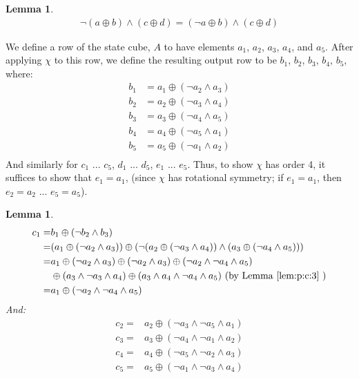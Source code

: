 \documentclass[10pt,twocolumn,twoside]{pnas-new}
\newtheorem{lemma}[theorem]{Lemma}
\begin{document}
\begin{lemma} \label{lem:p:c:3}
\begin{align*}
    \lnot(a \oplus b) \land (c \oplus d) = (\lnot a \oplus b) \land (c \oplus d)
\end{align*}
\end{lemma}

We define a row of the state cube, $A$ to have elements $a_1$, $a_2$, $a_3$,
$a_4$, and $a_5$. After applying $\chi$ to this row, we define the resulting
output row to be $b_1$, $b_2$, $b_3$, $b_4$, $b_5$, where:
\begin{align*}
    b_1 & = a_1 \oplus (\lnot a_2 \land a_3) \\
    b_2 & = a_2 \oplus (\lnot a_3 \land a_4) \\
    b_3 & = a_3 \oplus (\lnot a_4 \land a_5) \\
    b_4 & = a_4 \oplus (\lnot a_5 \land a_1) \\
    b_5 & = a_5 \oplus (\lnot a_1 \land a_2) \\
\end{align*}
And similarly for $c_1$ ... $c_5$,  $d_1$ ... $d_5$, $e_1$ ... $e_5$. Thus, to
show $\chi$ has order 4, it suffices to show that $e_1 = a_1$, (since $\chi$
has rotational symmetry; if $e_1 = a_1$, then $e_2 = a_2$ ... $e_5 = a_5$).

\begin{lemma} \label{lem:p:c:4}
\begin{align*}
    c_1 = & b_1 \oplus (\lnot b_2 \land b_3) \\
        = & (a_1 \oplus (\lnot a_2 \land a_3)) \oplus (\lnot (a_2 \oplus (\lnot a_3 \land a_4)) \land (a_3 \oplus (\lnot a_4 \land a_5))) \\
        = & a_1 \oplus (\lnot a_2 \land a_3) \oplus (\lnot a_2 \land a_3) \oplus (\lnot a_2 \land \lnot a_4 \land a_5) \\
          & \oplus (a_3 \land \lnot a_3 \land a_4) \oplus (a_3 \land a_4 \land \lnot a_4 \land a_5) \text{ (by Lemma \ref{lem:p:c:3} )} \\
        = & a_1 \oplus (\lnot a_2 \land \lnot a_4 \land a_5) \\
\end{align*}
And:
\begin{align*}
    c_2 = & a_2 \oplus (\lnot a_3 \land \lnot a_5 \land a_1) \\
    c_3 = & a_3 \oplus (\lnot a_4 \land \lnot a_1 \land a_2) \\
    c_4 = & a_4 \oplus (\lnot a_5 \land \lnot a_2 \land a_3) \\
    c_5 = & a_5 \oplus (\lnot a_1 \land \lnot a_3 \land a_4) \\
\end{align*}
\end{lemma}
\end{document}
